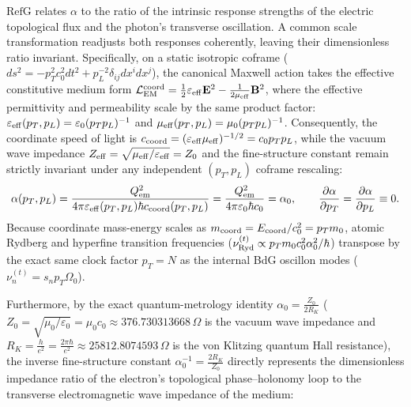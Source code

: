 \documentclass[11pt,a4paper]{article}
\newcommand{\RefG}{\mathrm{RefG}}
\begin{document}
$\RefG$ relates $\alpha$ to the ratio of the intrinsic response strengths of the electric topological flux and the photon's transverse oscillation. A common scale transformation readjusts both responses coherently, leaving their dimensionless ratio invariant. Specifically, on a static isotropic coframe ($ds^2 = -p_T^2 c_0^2 dt^2 + p_L^{-2}\delta_{ij}dx^i dx^j$), the canonical Maxwell action takes the effective constitutive medium form $\mathcal{L}_{\rm EM}^{\rm coord} = \frac{1}{2}\varepsilon_{\rm eff}\mathbf{E}^2 - \frac{1}{2\mu_{\rm eff}}\mathbf{B}^2$, where the effective permittivity and permeability scale by the same product factor: $\varepsilon_{\rm eff}(p_T, p_L) = \varepsilon_0(p_T p_L)^{-1}$ and $\mu_{\rm eff}(p_T, p_L) = \mu_0(p_T p_L)^{-1}$. Consequently, the coordinate speed of light is $c_{\rm coord} = (\varepsilon_{\rm eff}\mu_{\rm eff})^{-1/2} = c_0 p_T p_L$, while the vacuum wave impedance $Z_{\rm eff} = \sqrt{\mu_{\rm eff}/\varepsilon_{\rm eff}} = Z_0$ and the fine-structure constant remain strictly invariant under any independent $(p_T, p_L)$ coframe rescaling:
\begin{equation}
\alpha(p_T, p_L) = \frac{Q_{\rm em}^2}{4\pi\varepsilon_{\rm eff}(p_T, p_L)\hbar c_{\rm coord}(p_T, p_L)} = \frac{Q_{\rm em}^2}{4\pi\varepsilon_0\hbar c_0} = \alpha_0, \qquad \frac{\partial\alpha}{\partial p_T} = \frac{\partial\alpha}{\partial p_L} \equiv 0.
\end{equation}
Because coordinate mass-energy scales as $m_{\rm coord} = E_{\rm coord}/c_0^2 = p_T m_0$, atomic Rydberg and hyperfine transition frequencies ($\nu_{\rm Ryd}^{(t)} \propto p_T m_0 c_0^2 \alpha_0^2/\hbar$) transpose by the exact same clock factor $p_T = N$ as the internal BdG oscillon modes ($\nu_n^{(t)} = s_n p_T\Omega_0$).

Furthermore, by the exact quantum-metrology identity $\alpha_0 = \frac{Z_0}{2 R_K}$ ($Z_0 = \sqrt{\mu_0/\varepsilon_0} = \mu_0 c_0 \approx 376.730313668\,\Omega$ is the vacuum wave impedance and $R_K = \frac{h}{e^2} = \frac{2\pi\hbar}{e^2} \approx 25812.8074593\,\Omega$ is the von Klitzing quantum Hall resistance), the inverse fine-structure constant $\alpha_0^{-1} = \frac{2 R_K}{Z_0}$ directly represents the dimensionless impedance ratio of the electron's topological phase--holonomy loop to the transverse electromagnetic wave impedance of the medium:
\end{document}
